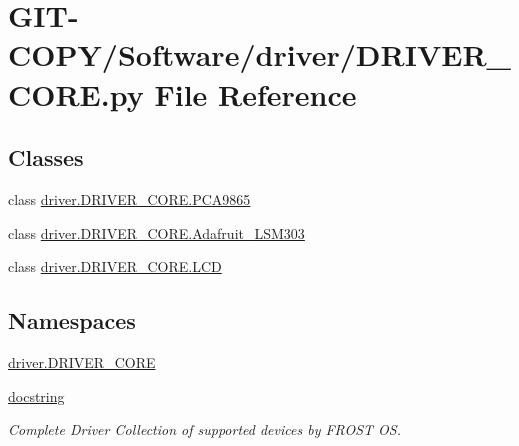 \hypertarget{GIT-COPY_2Software_2driver_2DRIVER__CORE_8py}{}\section{G\+I\+T-\/\+C\+O\+P\+Y/\+Software/driver/\+D\+R\+I\+V\+E\+R\+\_\+\+C\+O\+R\+E.py File Reference}
\label{GIT-COPY_2Software_2driver_2DRIVER__CORE_8py}
\subsection*{Classes}
\begin{DoxyCompactItemize}
\item 
class \hyperlink{classdriver_1_1DRIVER__CORE_1_1PCA9865}{driver.\+D\+R\+I\+V\+E\+R\+\_\+\+C\+O\+R\+E.\+P\+C\+A9865}
\item 
class \hyperlink{classdriver_1_1DRIVER__CORE_1_1Adafruit__LSM303}{driver.\+D\+R\+I\+V\+E\+R\+\_\+\+C\+O\+R\+E.\+Adafruit\+\_\+\+L\+S\+M303}
\item 
class \hyperlink{classdriver_1_1DRIVER__CORE_1_1LCD}{driver.\+D\+R\+I\+V\+E\+R\+\_\+\+C\+O\+R\+E.\+L\+C\+D}
\end{DoxyCompactItemize}
\subsection*{Namespaces}
\begin{DoxyCompactItemize}
\item 
 \hyperlink{namespacedriver_1_1DRIVER__CORE}{driver.\+D\+R\+I\+V\+E\+R\+\_\+\+C\+O\+R\+E}
\item 
 \hyperlink{namespacedocstring}{docstring}
\begin{DoxyCompactList}\small\item\em Complete Driver Collection of supported devices by F\+R\+O\+S\+T O\+S. \end{DoxyCompactList}\end{DoxyCompactItemize}
